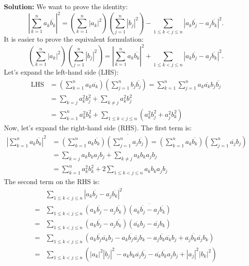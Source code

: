 \bigskip\noindent\textbf{Solution:}
We want to prove the identity:
\[
\left| \sum_{k=1}^n a_k \overline{b_k} \right|^2 = \left( \sum_{k=1}^n |a_k|^2 \right) \left( \sum_{j=1}^n |b_j|^2 \right) - \sum_{1 \leq k < j \leq n} |a_k \overline{b_j} - a_j \overline{b_k}|^2.
\]
It is easier to prove the equivalent formulation:
\[
\left( \sum_{k=1}^n |a_k|^2 \right) \left( \sum_{j=1}^n |b_j|^2 \right) = \left| \sum_{k=1}^n a_k \overline{b_k} \right|^2 + \sum_{1 \leq k < j \leq n} |a_k \overline{b_j} - a_j \overline{b_k}|^2.
\]
Let's expand the left-hand side (LHS):
\begin{align*}
\text{LHS} &= \left( \sum_{k=1}^n a_k \overline{a_k} \right) \left( \sum_{j=1}^n b_j \overline{b_j} \right) = \sum_{k=1}^n \sum_{j=1}^n a_k \overline{a_k} b_j \overline{b_j} \\
&= \sum_{k=j} a_k^2 b_j^2 + \sum_{k \neq j} a_k^2 b_j^2 \\
&= \sum_{k=1}^n a_k^2 b_k^2 + \sum_{1 \leq k < j \leq n} (a_k^2 b_j^2 + a_j^2 b_k^2)
\end{align*}
Now, let's expand the right-hand side (RHS). The first term is:
\begin{align*}
\left| \sum_{k=1}^n a_k \overline{b_k} \right|^2 &= \left(\sum_{k=1}^n a_k \overline{b_k}\right) \overline{\left(\sum_{j=1}^n a_j \overline{b_j}\right)} = \left(\sum_{k=1}^n a_k \overline{b_k}\right) \left(\sum_{j=1}^n \overline{a_j} b_j\right) \\
&= \sum_{k=j} a_k b_k a_j b_j + \sum_{k \neq j} a_k b_k a_j b_j \\
&= \sum_{k=1}^n a_k^2 b_k^2 + 2 \sum_{1 \leq k < j \leq n} a_k b_k a_j b_j
\end{align*}
The second term on the RHS is:
\begin{align*}
&\sum_{1 \leq k < j \leq n} |a_k \overline{b_j} - a_j \overline{b_k}|^2 \\
=& \sum_{1 \leq k < j \leq n} (a_k \overline{b_j} - a_j \overline{b_k}) \overline{(a_k \overline{b_j} - a_j \overline{b_k})} \\
=& \sum_{1 \leq k < j \leq n} (a_k \overline{b_j} - a_j \overline{b_k}) (\overline{a_k} b_j - \overline{a_j} b_k) \\
=& \sum_{1 \leq k < j \leq n} (a_k \overline{b_j} \overline{a_k} b_j - a_k \overline{b_j} \overline{a_j} b_k - a_j \overline{b_k} \overline{a_k} b_j + a_j \overline{b_k} \overline{a_j} b_k) \\
=& \sum_{1 \leq k < j \leq n} (|a_k|^2 |b_j|^2 - a_k b_k \overline{a_j} \overline{b_j} - \overline{a_k} \overline{b_k} a_j b_j + |a_j|^2 |b_k|^2)
\end{align*}
